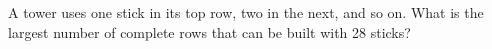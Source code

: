 A tower uses one stick in its top row, two in the next, and so on. What is the largest number of complete rows that can be built with 28 sticks?
